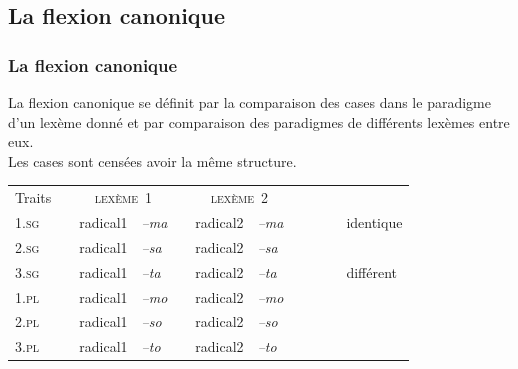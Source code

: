 \subsection{La flexion canonique}


\begin{frame}
\frametitle{La flexion canonique}
La flexion canonique se définit par la comparaison des cases dans le
paradigme d'un lexème donné et par comparaison des paradigmes de
différents lexèmes entre eux.\\
Les cases sont censées avoir la même structure.

\scriptsize

\begin{table}
\begin{tabular}{|l| p{1mm}|ll|p{1mm}|ll|p{1mm}cl}
\cline{1-1}\cline{3-4}\cline{6-7}
Traits&&\multicolumn{2}{|c|}{\textsc{ lexème~1}}&&\multicolumn{2}{|c|}{\textsc{ lexème~2}}&&\\
\cline{1-1}\cline{3-4}\cline{6-7}
\textsc{1.sg}&& radical1& {\em --ma}&&radical2& {\em
  --ma}&&\cellcolor{ciel}~~~&identique\\
\cline{1-1}\cline{3-4}\cline{6-7}
\textsc{2.sg}& &radical1&{\em --sa}&&radical2& {\em --sa}&&&\\
\cline{1-1}\cline{3-4}\cline{6-7}

\textsc{3.sg}&& radical1&{\em --ta}&&radical2& {\em
  --ta}&&\cellcolor{mandarine}&différent\\
\cline{1-1}\cline{3-4}\cline{6-7}
\textsc{1.pl}&&radical1& {\em --mo}&&radical2& {\em --mo}&&\\
\cline{1-1}\cline{3-4}\cline{6-7}
\textsc{2.pl}&&radical1& {\em --so}&&radical2& {\em --so}&&\\
\cline{1-1}\cline{3-4}\cline{6-7}
\textsc{3.pl}&&radical1& {\em --to}&&radical2& {\em --to}&&\\
\cline{1-1}\cline{3-4}\cline{6-7}
\end{tabular}\\[1mm]
\end{table}
\end{frame}

